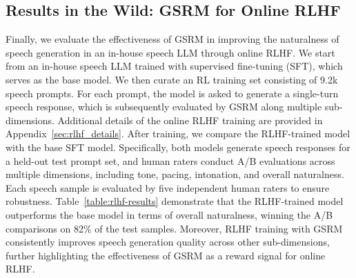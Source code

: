 \subsection{Results in the Wild: GSRM for Online RLHF}

Finally, we evaluate the effectiveness of GSRM in improving the naturalness of speech generation in an in-house speech LLM through online RLHF. We start from an in-house speech LLM trained with supervised fine-tuning (SFT), which serves as the base model. We then curate an RL training set consisting of 9.2k speech prompts. For each prompt, the model is asked to generate a single-turn speech response, which is subsequently evaluated by GSRM along multiple sub-dimensions. Additional details of the online RLHF training are provided in Appendix~\ref{sec:rlhf_details}. After training, we compare the RLHF-trained model with the base SFT model. Specifically, both models generate speech responses for a held-out test prompt set, and human raters conduct A/B evaluations across multiple dimensions, including tone, pacing, intonation, and overall naturalness. Each speech sample is evaluated by five independent human raters to ensure robustness. Table~\ref{table:rlhf-results} demonstrate that the RLHF-trained model outperforms the base model in terms of overall naturalness, winning the A/B comparisons on 82\% of the test samples. Moreover, RLHF training with GSRM consistently improves speech generation quality across other sub-dimensions, further highlighting the effectiveness of GSRM as a reward signal for online RLHF.